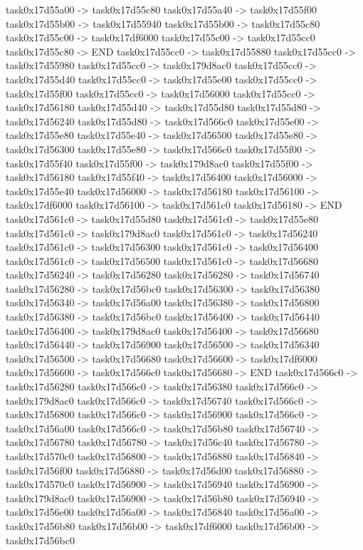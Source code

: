 {	task0x17d55a00 -> task0x17d55c80
	task0x17d55a40 -> task0x17d55f00
	task0x17d55b00 -> task0x17d55940
	task0x17d55b00 -> task0x17d55c80
	task0x17d55c00 -> task0x17df6000
	task0x17d55c00 -> task0x17d55cc0
	task0x17d55c80 -> END
	task0x17d55cc0 -> task0x17d55880
	task0x17d55cc0 -> task0x17d55980
	task0x17d55cc0 -> task0x179d8ac0
	task0x17d55cc0 -> task0x17d55d40
	task0x17d55cc0 -> task0x17d55e00
	task0x17d55cc0 -> task0x17d55f00
	task0x17d55cc0 -> task0x17d56000
	task0x17d55cc0 -> task0x17d56180
	task0x17d55d40 -> task0x17d55d80
	task0x17d55d80 -> task0x17d56240
	task0x17d55d80 -> task0x17d566c0
	task0x17d55e00 -> task0x17d55e80
	task0x17d55e40 -> task0x17d56500
	task0x17d55e80 -> task0x17d56300
	task0x17d55e80 -> task0x17d566c0
	task0x17d55f00 -> task0x17d55f40
	task0x17d55f00 -> task0x179d8ac0
	task0x17d55f00 -> task0x17d56180
	task0x17d55f40 -> task0x17d56400
	task0x17d56000 -> task0x17d55e40
	task0x17d56000 -> task0x17d56180
	task0x17d56100 -> task0x17df6000
	task0x17d56100 -> task0x17d561c0
	task0x17d56180 -> END
	task0x17d561c0 -> task0x17d55d80
	task0x17d561c0 -> task0x17d55e80
	task0x17d561c0 -> task0x179d8ac0
	task0x17d561c0 -> task0x17d56240
	task0x17d561c0 -> task0x17d56300
	task0x17d561c0 -> task0x17d56400
	task0x17d561c0 -> task0x17d56500
	task0x17d561c0 -> task0x17d56680
	task0x17d56240 -> task0x17d56280
	task0x17d56280 -> task0x17d56740
	task0x17d56280 -> task0x17d56bc0
	task0x17d56300 -> task0x17d56380
	task0x17d56340 -> task0x17d56a00
	task0x17d56380 -> task0x17d56800
	task0x17d56380 -> task0x17d56bc0
	task0x17d56400 -> task0x17d56440
	task0x17d56400 -> task0x179d8ac0
	task0x17d56400 -> task0x17d56680
	task0x17d56440 -> task0x17d56900
	task0x17d56500 -> task0x17d56340
	task0x17d56500 -> task0x17d56680
	task0x17d56600 -> task0x17df6000
	task0x17d56600 -> task0x17d566c0
	task0x17d56680 -> END
	task0x17d566c0 -> task0x17d56280
	task0x17d566c0 -> task0x17d56380
	task0x17d566c0 -> task0x179d8ac0
	task0x17d566c0 -> task0x17d56740
	task0x17d566c0 -> task0x17d56800
	task0x17d566c0 -> task0x17d56900
	task0x17d566c0 -> task0x17d56a00
	task0x17d566c0 -> task0x17d56b80
	task0x17d56740 -> task0x17d56780
	task0x17d56780 -> task0x17d56c40
	task0x17d56780 -> task0x17d570c0
	task0x17d56800 -> task0x17d56880
	task0x17d56840 -> task0x17d56f00
	task0x17d56880 -> task0x17d56d00
	task0x17d56880 -> task0x17d570c0
	task0x17d56900 -> task0x17d56940
	task0x17d56900 -> task0x179d8ac0
	task0x17d56900 -> task0x17d56b80
	task0x17d56940 -> task0x17d56e00
	task0x17d56a00 -> task0x17d56840
	task0x17d56a00 -> task0x17d56b80
	task0x17d56b00 -> task0x17df6000
	task0x17d56b00 -> task0x17d56bc0
}
